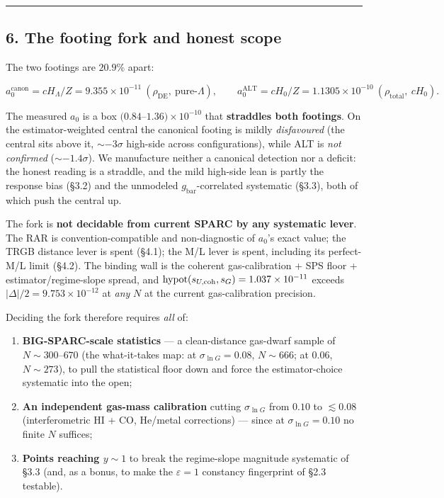 \documentclass[
]{article}
\providecommand{\tightlist}{%
  \setlength{\itemsep}{0pt}\setlength{\parskip}{0pt}}
\begin{document}
\begin{center}\rule{0.5\linewidth}{0.5pt}\end{center}

\subsection{6. The footing fork and honest
scope}\label{the-footing-fork-and-honest-scope}

The two footings are \(20.9\%\) apart:

\[a_0^\mathrm{canon}=cH_\Lambda/Z=9.355\times10^{-11}\ (\rho_\mathrm{DE},\ \text{pure-}\Lambda),\qquad a_0^\mathrm{ALT}=cH_0/Z=1.1305\times10^{-10}\ (\rho_\mathrm{total},\ cH_0).\]

The measured \(a_0\) is a box \((0.84\)--\(1.36)\times10^{-10}\) that
\textbf{straddles both footings}. On the estimator-weighted central the
canonical footing is mildly \emph{disfavoured} (the central sits above
it, \(\sim-3\sigma\) high-side across configurations), while ALT is
\emph{not confirmed} (\(\sim-1.4\sigma\)). We manufacture neither a
canonical detection nor a deficit: the honest reading is a straddle, and
the mild high-side lean is partly the response bias (§3.2) and the
unmodeled \(g_\mathrm{bar}\)-correlated systematic (§3.3), both of which
push the central up.

The fork is \textbf{not decidable from current SPARC by any systematic
lever}. The RAR is convention-compatible and non-diagnostic of \(a_0\)'s
exact value; the TRGB distance lever is spent (§4.1); the M/L lever is
spent, including its perfect-M/L limit (§4.2). The binding wall is the
coherent gas-calibration + SPS floor + estimator/regime-slope spread,
and \(\mathrm{hypot}(s_{U,\rm coh},s_G)=1.037\times10^{-11}\) exceeds
\(|\Delta|/2=9.753\times10^{-12}\) at \emph{any} \(N\) at the current
gas-calibration precision.

Deciding the fork therefore requires \emph{all} of:

\begin{enumerate}
\def\labelenumi{\arabic{enumi}.}
\tightlist
\item
  \textbf{BIG-SPARC-scale statistics} --- a clean-distance gas-dwarf
  sample of \(N\sim300\)--\(670\) (the what-it-takes map: at
  \(\sigma_{\ln G}=0.08\), \(N\sim666\); at \(0.06\), \(N\sim273\)), to
  pull the statistical floor down and force the estimator-choice
  systematic into the open;
\item
  \textbf{An independent gas-mass calibration} cutting
  \(\sigma_{\ln G}\) from \(0.10\) to \(\lesssim0.08\) (interferometric
  HI + CO, He/metal corrections) --- since at \(\sigma_{\ln G}=0.10\) no
  finite \(N\) suffices;
\item
  \textbf{Points reaching \(y\sim1\)} to break the regime-slope
  magnitude systematic of §3.3 (and, as a bonus, to make the
  \(\varepsilon=1\) constancy fingerprint of §2.3 testable).
\end{enumerate}
\end{document}
